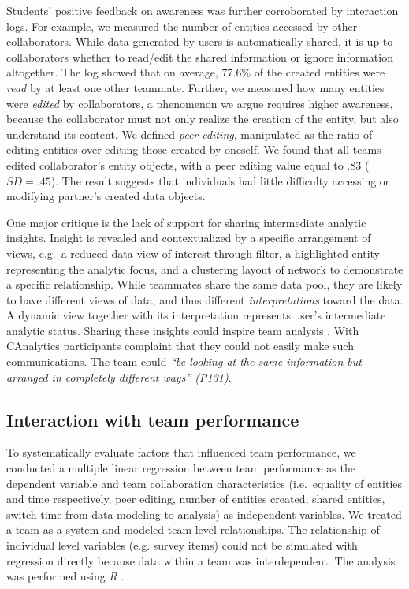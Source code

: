 Students' positive feedback on awareness was further corroborated by
interaction logs. For example, we measured the number of entities
accessed by other collaborators. While data
generated by users is automatically shared, it is up to collaborators
whether to read/edit the shared information or ignore information altogether.
The log showed that on average, 77.6\% of the created entities
were \emph{read} by at least one other teammate. Further, we measured how
many entities were \emph{edited} by collaborators, a phenomenon we argue
requires higher awareness, because the collaborator must not only realize
the creation of the entity, but also understand its content. We
defined \emph{peer editing}, manipulated as the ratio of editing 
entities over editing those created by oneself. We found that all teams
edited collaborator's entity objects, with a peer editing value equal
to .83 ($SD=.45$). The result suggests that individuals had little difficulty
accessing or modifying partner's created data objects.

One major critique is the lack of support for sharing intermediate analytic
insights. Insight is revealed and contextualized by a specific arrangement of views, e.g.~a reduced data view of interest through filter, a highlighted entity representing the analytic focus, and a clustering layout of network to demonstrate a specific relationship. While teammates share the same data pool, they are likely to have different views of data, and thus different \emph{interpretations}
toward the data. A dynamic view together with its interpretation represents
user's intermediate analytic status. Sharing these insights could inspire team analysis \citep{Gotz2009d}. With CAnalytics
participants complaint that they could not easily make such communications. The team could \emph{``be
looking at the same information but arranged in completely different
ways'' (P131)}.

\subsection{Interaction with team performance}

To systematically evaluate factors that influenced team performance,
we conducted a multiple linear regression between team performance
as the dependent variable and team collaboration characteristics
(i.e.~equality of entities and time respectively, peer editing, number of entities created, shared
entities, switch time from data modeling to analysis) as independent
variables. We treated a team as a system \citep{Henman2003b} and modeled team-level
relationships.
The relationship of individual level variables (e.g.
survey items) could not be simulated with regression directly because data within a team was interdependent. The analysis was performed using \emph{R} \citep{R2016}.

